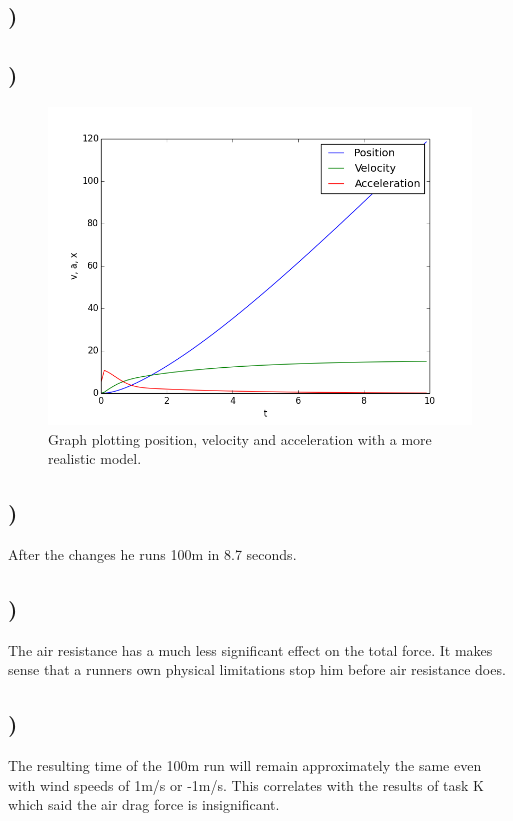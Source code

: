 \documentclass[a4paper,10pt,norsk]{article}
\begin{document}
 \subsection{)}
 
 \subsection{)}
 
 \begin{figure}[h!]
        \centering 
        \includegraphics[scale=0.5]{taskI.png} 
        \caption{Graph plotting position, velocity and acceleration with a more realistic model.}
\end{figure}
 
 

\subsection{)}
After the changes he runs 100m in 8.7 seconds.
 
\subsection{)}
The air resistance has a much less significant effect on the total force. It makes sense that a runners own physical limitations stop him before air resistance does.

\subsection{)}
The resulting time of the 100m run will remain approximately the same even with wind speeds of 1m/s or -1m/s. This correlates with the results of task K which said the air drag force is insignificant.
\end{document}
